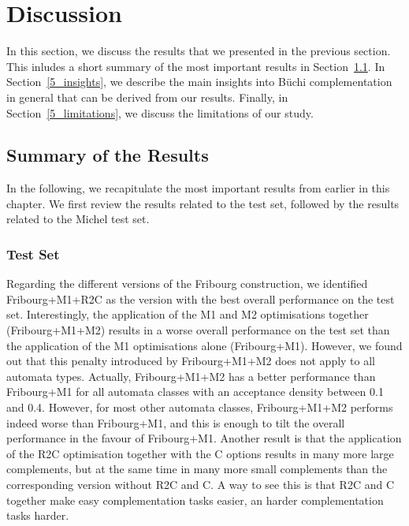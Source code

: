 
\section{Discussion}
\label{5_discussion}
In this section, we discuss the results that we presented in the previous section. This inludes a short summary of the most important results in Section~\ref{5_summary}. In Section~\ref{5_insights}, we describe the main insights into Büchi complementation in general that can be derived from our results. Finally, in Section~\ref{5_limitations}, we discuss the limitations of our study. 

\subsection{Summary of the Results}
\label{5_summary}
In the following, we recapitulate the most important results from earlier in this chapter. We first review the results related to the \goal{} test set, followed by the results related to the Michel test set.

\subsubsection{\goal{} Test Set}
Regarding the different versions of the Fribourg construction, we identified Fribourg+M1+R2C as the version with the best overall performance on the \goal{} test set. Interestingly, the application of the M1 and M2 optimisations together (Fribourg+M1+M2) results in a worse overall performance on the \goal{} test set than the application of the M1 optimisations alone (Fribourg+M1). However, we found out that this penalty introduced by Fribourg+M1+M2 does not apply to all automata types. Actually, Fribourg+M1+M2 has a better performance than Fribourg+M1 for all automata classes with an acceptance density between 0.1 and 0.4. However, for most other automata classes, Fribourg+M1+M2 performs indeed worse than Fribourg+M1, and this is enough to tilt the overall performance in the favour of Fribourg+M1. Another result is that the application of the R2C optimisation together with the C options results in many more large complements, but at the same time in many more small complements than the corresponding version without R2C and C. A way to see this is that R2C and C together make easy complementation tasks easier, an harder complementation tasks harder.


